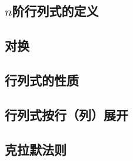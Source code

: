 \subsection{$n$阶行列式的定义}

\subsection{对换}

\subsection{行列式的性质}

\subsection{行列式按行（列）展开}

\subsection{克拉默法则}
